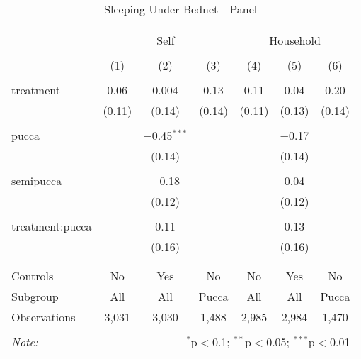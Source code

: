 
\begin{table}[!htbp] \centering 
  \caption{Sleeping Under Bednet - Panel} 
  \label{tbl:Sleeping Under Bednet - Panel} 
\begin{tabular}{@{\extracolsep{5pt}}lcccccc} 
\\[-1.8ex]\hline 
\hline \\[-1.8ex] 
 & \multicolumn{3}{c}{Self} & \multicolumn{3}{c}{Household} \\ 
\\[-1.8ex] & (1) & (2) & (3) & (4) & (5) & (6)\\ 
\hline \\[-1.8ex] 
 treatment & 0.06 & 0.004 & 0.13 & 0.11 & 0.04 & 0.20 \\ 
  & (0.11) & (0.14) & (0.14) & (0.11) & (0.13) & (0.14) \\ 
  & & & & & & \\ 
 pucca &  & $-$0.45$^{***}$ &  &  & $-$0.17 &  \\ 
  &  & (0.14) &  &  & (0.14) &  \\ 
  & & & & & & \\ 
 semipucca &  & $-$0.18 &  &  & 0.04 &  \\ 
  &  & (0.12) &  &  & (0.12) &  \\ 
  & & & & & & \\ 
 treatment:pucca &  & 0.11 &  &  & 0.13 &  \\ 
  &  & (0.16) &  &  & (0.16) &  \\ 
  & & & & & & \\ 
\hline \\[-1.8ex] 
Controls & No & Yes & No & No & Yes & No \\ 
Subgroup & All & All & Pucca & All & All & Pucca \\ 
Observations & 3,031 & 3,030 & 1,488 & 2,985 & 2,984 & 1,470 \\ 
\hline 
\hline \\[-1.8ex] 
\textit{Note:}  & \multicolumn{6}{r}{$^{*}$p$<$0.1; $^{**}$p$<$0.05; $^{***}$p$<$0.01} \\ 
\end{tabular} 
\end{table} 
